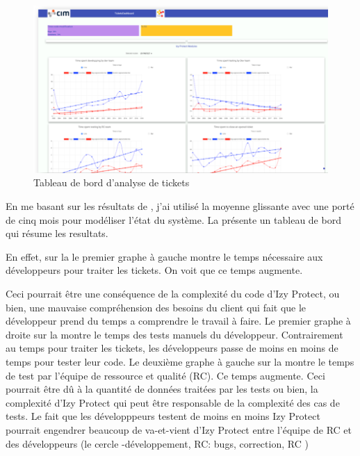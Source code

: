 \documentclass[a4paper]{article}
\begin{document}
\begin{figure}[htbp]
  \begin{center}
  \includegraphics[width=\linewidth]{./figures/dashboard.png}
  \caption{Tableau de bord d'analyse de tickets 
}
  \label{fig:dashboardFig}
\end{center}
\vspace{-0.3cm}
\end{figure}
En me basant sur les résultats de \cite{Raja09}, j'ai utilisé la moyenne glissante avec une porté de cinq mois pour modéliser l'état du système.
La  présente un tableau de bord qui résume les resultats.

En effet, sur la  le premier graphe à gauche montre le temps nécessaire aux développeurs pour traiter les tickets. 
On voit que ce temps augmente.

Ceci pourrait être une conséquence de la complexité du code d'Izy Protect, ou bien, une mauvaise compréhension des besoins du client qui fait que le développeur prend du temps a comprendre le travail à faire.
Le premier graphe à droite  sur la  montre le temps des tests manuels du développeur. 
Contrairement au temps pour traiter les tickets, les développeurs passe de moins en moins de temps pour tester leur code.
Le deuxième graphe à gauche  sur la  montre le temps de test par l'équipe de ressource et qualité (RC). Ce temps augmente.
Ceci pourrait être dû  à la quantité de données traitées par les tests ou bien, la complexité d'Izy Protect qui peut être responsable de la complexité des cas de tests.
Le fait que les développpeurs testent de moins en moins Izy Protect  pourrait engendrer beaucoup de va-et-vient d'Izy Protect entre l'équipe de RC et des développeurs (le cercle -développement, RC: bugs, correction, RC )
\end{document}
